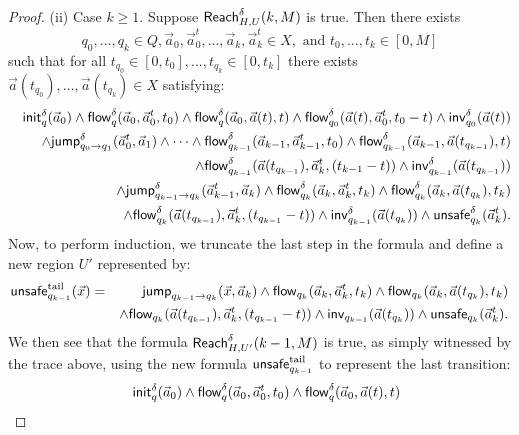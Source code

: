 \documentclass[12pt]{article}
\begin{document}
\begin{proof}
(ii) Case $k \geq 1$. Suppose $\mathsf{Reach}^{\delta}_{H,U}(k,M)$ is true. Then there exists 
$$q_0, ... ,q_{k}\in Q, \vec a_{0}, \vec a_{0}^t, ... ,\vec a_{k}, \vec a_{k}^t \in X,\mbox{ and } t_0,...,t_k\in[0, M]$$ such that for all $t_{q_0}\in [0,t_0],...,t_{q_k}\in [0,t_k]$ there exists $\vec a(t_{q_0}),...,\vec a(t_{q_k})\in X$ satisfying:
\begin{eqnarray*}\label{kstep}
& &\mathsf{init}_{q}^{\delta}(\vec a_0)\wedge\mathsf{flow}_{q}^{\delta}(\vec a_{0}, \vec a_0^t, t_0) \wedge \mathsf{flow}_q^{\delta}(\vec a_0, \vec a(t), t)\wedge \mathsf{flow}^{\delta}_{q_0}(\vec a(t), \vec a_0^t, t_0-t)\wedge \mathsf{inv}^{\delta}_{q_0}(\vec a(t))\\
& & \wedge \mathsf{jump}^{\delta}_{q_0\rightarrow q_1}(\vec a_0^t, \vec a_1)\wedge\cdots\wedge \mathsf{flow}_{q_{k-1}}^{\delta}(\vec a_{k-1}, \vec a_{k-1}^t, t_0)
\wedge\mathsf{flow}_{q_{k-1}}^{\delta}(\vec a_{k-1}, \vec a(t_{q_{k-1}}), t)\\
& &\wedge \mathsf{flow}^{\delta}_{q_{k-1}}(\vec a(t_{q_{k-1}}), \vec a_k^t, (t_{k-1}-t))\wedge \mathsf{inv}^{\delta}_{q_{k-1}}(\vec a(t_{q_{k-1}}))\\
& &\wedge \mathsf{jump}^{\delta}_{q_{k-1}\rightarrow q_k}(\vec a_{k-1}^t, \vec a_k)\wedge \mathsf{flow}_{q_{k}}^{\delta}(\vec a_{k}, \vec a_{k}^t, t_k)
\wedge\mathsf{flow}_{q_{k}}^{\delta}(\vec a_{k}, \vec a(t_{q_{k}}), t_k)\\
& &\wedge \mathsf{flow}^{\delta}_{q_{k}}(\vec a(t_{q_{k-1}}), \vec a_k^t, (t_{q_{k-1}}-t))\wedge \mathsf{inv}^{\delta}_{q_{k-1}}(\vec a(t_{q_{k}}))\wedge \mathsf{unsafe}^{\delta}_{q_k}(\vec a_k^t).
\end{eqnarray*}
Now, to perform induction, we truncate the last step in the formula and define a new region $U'$ represented by:
\begin{eqnarray*}
\mathsf{unsafe}^{\mathrm{tail}}_{q_{k-1}}(\vec x) &=& \mathsf{jump}_{q_{k-1}\rightarrow q_k}(\vec x, \vec a_k)\wedge \mathsf{flow}_{q_{k}}(\vec a_{k}, \vec a_{k}^t, t_k)\wedge\mathsf{flow}_{q_{k}}(\vec a_{k}, \vec a(t_{q_{k}}), t_k)\\
& &\wedge \mathsf{flow}_{q_{k}}(\vec a(t_{q_{k-1}}), \vec a_k^t, (t_{q_{k-1}}-t))\wedge \mathsf{inv}_{q_{k-1}}(\vec a(t_{q_{k}}))\wedge \mathsf{unsafe}_{q_k}(\vec a_k^t).
\end{eqnarray*}
We then see that the formula
$\mathsf{Reach}_{H, U'}^{\delta}(k-1, M)$
is true, as simply witnessed by the trace above, using the new formula $\mathsf{unsafe}^{\mathrm{tail}}_{q_{k-1}}$ to represent the last transition:
\begin{eqnarray*}\label{kstep}
& &\init_{q}^{\delta}(\vec a_0)\wedge\flow_{q}^{\delta}(\vec a_{0}, \vec a_0^t, t_0) \wedge \flow_q^{\delta}(\vec a_0, \vec a(t), t)

\end{eqnarray*}
\end{proof}
\end{document}
